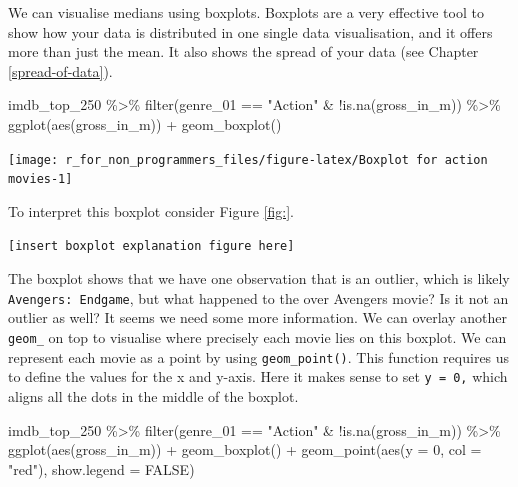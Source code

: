 \documentclass[
]{book}
\newenvironment{Shaded}{\begin{snugshade}}{\end{snugshade}}
\newcommand{\AttributeTok}[1]{\textcolor[rgb]{0.77,0.63,0.00}{#1}}
\newcommand{\ConstantTok}[1]{\textcolor[rgb]{0.00,0.00,0.00}{#1}}
\newcommand{\DecValTok}[1]{\textcolor[rgb]{0.00,0.00,0.81}{#1}}
\newcommand{\FunctionTok}[1]{\textcolor[rgb]{0.00,0.00,0.00}{#1}}
\newcommand{\NormalTok}[1]{#1}
\newcommand{\SpecialCharTok}[1]{\textcolor[rgb]{0.00,0.00,0.00}{#1}}
\newcommand{\StringTok}[1]{\textcolor[rgb]{0.31,0.60,0.02}{#1}}
\begin{document}
We can visualise medians using boxplots. Boxplots are a very effective tool to show how your data is distributed in one single data visualisation, and it offers more than just the mean. It also shows the spread of your data (see Chapter \ref{spread-of-data}).

\begin{Shaded}
\begin{Highlighting}[]
\NormalTok{imdb\_top\_250 }\SpecialCharTok{\%\textgreater{}\%} 
  \FunctionTok{filter}\NormalTok{(genre\_01 }\SpecialCharTok{==} \StringTok{"Action"} \SpecialCharTok{\&} \SpecialCharTok{!}\FunctionTok{is.na}\NormalTok{(gross\_in\_m)) }\SpecialCharTok{\%\textgreater{}\%}
  \FunctionTok{ggplot}\NormalTok{(}\FunctionTok{aes}\NormalTok{(gross\_in\_m)) }\SpecialCharTok{+} 
  \FunctionTok{geom\_boxplot}\NormalTok{()}
\end{Highlighting}
\end{Shaded}

\begin{center}\texttt{[image: r\_for\_non\_programmers\_files/figure-latex/Boxplot for action movies-1]} \end{center}

To interpret this boxplot consider Figure \ref{fig:}.

\texttt{{[}insert\ boxplot\ explanation\ figure\ here{]}}

The boxplot shows that we have one observation that is an outlier, which is likely \texttt{Avengers:\ Endgame}, but what happened to the over Avengers movie? Is it not an outlier as well? It seems we need some more information. We can overlay another \texttt{geom\_} on top to visualise where precisely each movie lies on this boxplot. We can represent each movie as a point by using \texttt{geom\_point()}. This function requires us to define the values for the x and y-axis. Here it makes sense to set \texttt{y\ =\ 0,} which aligns all the dots in the middle of the boxplot.

\begin{Shaded}
\begin{Highlighting}[]
\NormalTok{imdb\_top\_250 }\SpecialCharTok{\%\textgreater{}\%} 
  \FunctionTok{filter}\NormalTok{(genre\_01 }\SpecialCharTok{==} \StringTok{"Action"} \SpecialCharTok{\&} \SpecialCharTok{!}\FunctionTok{is.na}\NormalTok{(gross\_in\_m)) }\SpecialCharTok{\%\textgreater{}\%}
  \FunctionTok{ggplot}\NormalTok{(}\FunctionTok{aes}\NormalTok{(gross\_in\_m)) }\SpecialCharTok{+} 
  \FunctionTok{geom\_boxplot}\NormalTok{() }\SpecialCharTok{+}
  \FunctionTok{geom\_point}\NormalTok{(}\FunctionTok{aes}\NormalTok{(}\AttributeTok{y =} \DecValTok{0}\NormalTok{, }\AttributeTok{col =} \StringTok{"red"}\NormalTok{), }\AttributeTok{show.legend =} \ConstantTok{FALSE}\NormalTok{)}
\end{Highlighting}
\end{Shaded}
\end{document}
